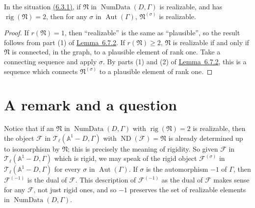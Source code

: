 In the situation \hyperref[par:6.3.1]{(6.3.1)}, if \(\mathfrak{N}\) in \(\operatorname{NumData}(D,\Gamma)\) is realizable, and has \(\operatorname{rig}(\mathfrak{N})=2\), then for any \(\sigma\) in \(\operatorname{Aut}(\Gamma)\), \(\mathfrak{N}^{(\sigma)}\) is realizable.
\begin{proof}
If \(r(\mathfrak{N})=1\), then ``realizable'' is the same as ``plausible'', so the result follows from part (1) of \hyperref[lem:6.7.2]{Lemma~6.7.2}. If \(r(\mathfrak{N})\geq2\), \(\mathfrak{N}\) is realizable if and only if \(\mathfrak{N}\) is connected, in the graph, to a plausible element of rank one. Take a connecting sequence and apply \(\sigma\). By parts (1) and (2) of \hyperref[lem:6.7.2]{Lemma~6.7.2}, this is a sequence which connects \(\mathfrak{N}^{(\sigma)}\) to a plausible element of rank one.
\end{proof}

\section{A remark and a question}
\label{sec:6.8}

Notice that if an \(\mathfrak{N}\) in \(\operatorname{NumData}(D,\Gamma)\) with \(\operatorname{rig}(\mathfrak{N})=2\) is realizable, then the object \(\mathcal{F}\) in \(\mathcal{T}_\ell(\mathbb{A}^1-D,\Gamma)\) with \(\operatorname{ND}(\mathcal{F})=\mathfrak{N}\) is already determined up to isomorphism by \(\mathfrak{N}\); this is precisely the meaning of rigidity. So given \(\mathcal{F}\) in \(\mathcal{T}_\ell(\mathbb{A}^1-D,\Gamma)\) which is rigid, we may speak of the rigid object \(\mathcal{F}^{(\sigma)}\) in \(\mathcal{T}_\ell(\mathbb{A}^1-D,\Gamma)\) for every \(\sigma\) in \(\operatorname{Aut}(\Gamma)\). If \(\sigma\) is the automorphism \(-1\) of \(\Gamma\), then \(\mathcal{F}^{(-1)}\) is the dual of \(\mathcal{F}\). This description of \(\mathcal{F}^{(-1)}\) as the dual of \(\mathcal{F}\) makes sense for any \(\mathcal{F}\), not just rigid ones, and so \(-1\) preserves the set of realizable elements in \(\operatorname{NumData}(D,\Gamma)\).

